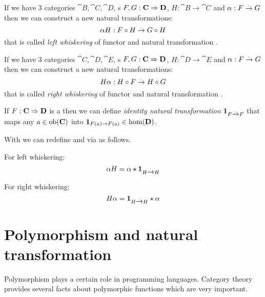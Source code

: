 \begin{definition}
\label{def:lw}
If we have 3 categories $\cat{B}, \cat{C}, \cat{D}$, 
s $F,G: \mathbf{C} \Rightarrow \mathbf{D}$, $H: \cat{B} \to
\cat{C}$ and  
$\alpha: F \xrightarrow{.} G$ then we can construct a new natural
transformations:
\[
\alpha H : F \circ H \xrightarrow{.} G \circ H
\]
that is called \textit{left whiskering} of functor and natural
transformation \cite{nlab:whiskering}. 
\end{definition}

\begin{definition}
\label{def:rw}
If we have 3 categories $\cat{C}, \cat{D}, \cat{E}$, 
s $F,G: \mathbf{C} \Rightarrow \mathbf{D}$, $H: \cat{D} \to
\cat{E}$ and  
$\alpha: F \xrightarrow{.} G$ then we can construct a new natural 
transformations: 
\[
H \alpha : H \circ F \xrightarrow{.} H \circ G
\]
that is called \textit{right whiskering} of functor and natural
transformation \cite{nlab:whiskering}. 
\end{definition}

\begin{definition}
\label{def:idnt}
If $F: \mathbf{C} \Rightarrow \mathbf{D}$ is a  then we can
define \textit{identity natural transformation}
$\mathbf{1}_{ F \xrightarrow{.} F }$ that maps any  
$a \in \mathrm{ob}(\mathbf{C})$ into  $\mathbf{1}_{ F(a) \to F(a) } \in \mathrm{hom}(\mathbf{D})$.
\end{definition}

\begin{remark}[Whiskering]
\label{rem:whiskering}
With  we can redefine  and
 via  as follows.

For left whiskering:
\begin{equation}
\label{eq:lw}
\alpha H = \alpha \star \mathbf{1}_{ H \xrightarrow{.} H }
\end{equation}

For right whiskering:
\begin{equation}
\label{eq:rw}
H \alpha = \mathbf{1}_{ H \xrightarrow{.} H } \star \alpha
\end{equation}
\end{remark}


\section{Polymorphism and natural transformation}

Polymorphism plays a certain role in programming languages. Category
theory provides several facts about polymorphic functions which are
very important.

